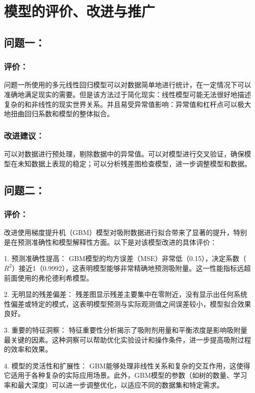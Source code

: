\documentclass[AutoFakeBold]{ctexart}
\begin{document}
	\section{模型的评价、改进与推广}
	\subsection{问题一：}
	\subsubsection{评价：}
	 问题一所使用的多元线性回归模型可以对数据简单地进行统计，在一定情况下可以准确地满足现实的需要。但是该方法过于简化现实：线性模型可能无法很好地描述复杂的和非线性的现实世界关系。并且易受异常值影响：异常值和杠杆点可以极大地扭曲回归系数和模型的整体拟合。
	\subsubsection{改进建议：}
	可以对数据进行预处理，剔除数据中的异常值。可以对模型进行交叉验证，确保模型在未知数据上表现的稳定；可以分析残差图检查模型，进一步调整模型和数据。
	
	\subsection{问题二：}
	\subsubsection{评价：}
	改进使用梯度提升机（GBM）模型对吸附数据进行拟合带来了显著的提升，特别是在预测准确性和模型解释性方面。以下是对该模型改进的具体评价：
	
	1. 预测准确性提高：
	 GBM模型的均方误差（MSE）非常低（0.15），决定系数（$R^2$）接近1（0.9992），这表明模型能够非常精确地预测吸附量。这一性能指标远超前面使用的弗伦德利希模型。
	
	2. 无明显的残差偏差：
	 残差图显示残差主要集中在零附近，没有显示出任何系统性偏差或特定的模式，这表明模型预测与实际观测值之间误差较小，模型拟合效果良好。
	
	3. 重要的特征洞察：
	 特征重要性分析揭示了吸附剂用量和平衡浓度是影响吸附量最关键的因素。这种洞察可以帮助优化实验设计和操作条件，进一步提高吸附过程的效率和效果。
	
	4. 模型的灵活性和扩展性：
	 GBM能够处理非线性关系和复杂的交互作用，这使得它适用于各种复杂的实际应用场景。此外，GBM模型的参数（如树的数量、学习率和最大深度）可以进一步调整优化，以适应不同的数据集和特定需求。\cite{friedman2001greedy}
	
\end{document}
